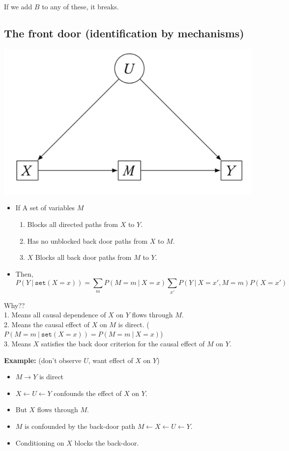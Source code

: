 \documentclass[]{article}
\providecommand{\tightlist}{%
  \setlength{\itemsep}{0pt}\setlength{\parskip}{0pt}}
\begin{document}
If we add \(B\) to any of these, it breaks.

\hypertarget{the-front-door-identification-by-mechanisms}{%
\subsection{The front door (identification by
mechanisms)}\label{the-front-door-identification-by-mechanisms}}

\begin{center}\includegraphics[width=0.5\linewidth]{gfx/front-door} \end{center}

\begin{itemize}
\item
  If A set of variables \(M\)

  \begin{enumerate}
  \def\labelenumi{\arabic{enumi}.}
  \tightlist
  \item
    Blocks all directed paths from \(X\) to \(Y\).
  \item
    Has no unblocked back door paths from \(X\) to \(M\).
  \item
    \(X\) Blocks all back door paths from \(M\) to \(Y\).
  \end{enumerate}
\item
  Then, \[
  P(Y\ \vert\ \texttt{set}(X=x)) = \sum_m P(M=m\ \vert\ X=x) \sum_{x'} P(Y\ \vert\ X=x', M=m)P(X=x')
  \]
\end{itemize}

Why??\\
1. Means all causal dependence of \(X\) on \(Y\) flows through \(M\).\\
2. Means the causal effect of \(X\) on \(M\) is direct.
(\(P(M=m\ \vert\ \texttt{set}(X=x)) = P(M=m\ \vert\ X=x)\))\\
3. Means \(X\) satisfies the back door criterion for the causal effect
of \(M\) on \(Y\).

\textbf{Example:} (don't observe \(U\), want effect of \(X\) on \(Y\))

\begin{itemize}
\tightlist
\item
  \(M \rightarrow Y\) is direct\\
\item
  \(X \leftarrow U \leftarrow Y\) confounds the effect of \(X\) on
  \(Y\).\\
\item
  But \(X\) flows through \(M\).\\
\item
  \(M\) is confounded by the back-door path
  \(M\leftarrow X\leftarrow U\leftarrow Y\).\\
\item
  Conditioning on \(X\) blocks the back-door.
\end{itemize}
\end{document}
